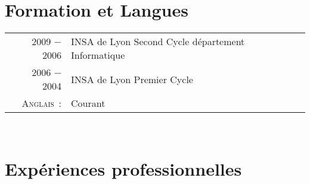\documentclass[a4paper,10pt]{article}
\begin{document}
  \section{Formation et Langues}
  \begin{tabular}{rl}
    2009 − 2006         & INSA de Lyon Second Cycle département Informatique \\
    2006 − 2004         & INSA de Lyon Premier Cycle \\
    \textsc{Anglais :}  & Courant \\
  \end{tabular} \\

  \section{Expériences professionnelles}
\end{document}
